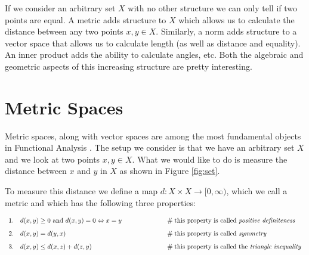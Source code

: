 \documentclass{article}
\theoremstyle{definition}
\begin{document}
\bigskip
\noindent
If we consider an arbitrary set $X$ with no other structure we
can only tell if two points are equal. A metric adds structure to
$X$ which allows us to calculate the distance between any two
points $x,y \in X$. Similarly, a norm adds structure to a vector
space that allows us to calculate length (as well as distance and
equality).  An inner product adds the ability to calculate
angles, etc. Both the algebraic and geometric aspects of this
increasing structure are pretty interesting.

\section{Metric Spaces}
\label{sec:metric_spaces}
Metric spaces, along with vector spaces are among the most
fundamental objects in Functional Analysis \cite{metric_spaces}.
The setup we consider is that we have an arbitrary set $X$ and we
look at two points $x,y \in X$. What we would like to do is
measure the distance between $x$ and $y$ in $X$ as shown in
Figure \ref{fig:set}.

\bigskip
\noindent
To measure this distance we define a map $d: X \times X
\rightarrow [0,\infty)$, which we call a metric and which has the
following three properties:


\begin{equation*}
\begin{array}{llll}
1. & d(x,y) \geq 0 \text{ and } d(x,y) = 0 \Leftrightarrow x = y
                && \hspace{5em} \mathrel{\#} \text{this property is called \emph{positive definiteness}} \\
[8pt]
2. & d(x,y) = d(y,x)
                && \hspace{5em} \mathrel{\#} \text{this property is called \emph{symmetry}} \\
[8pt]
3. & d(x,y) \leq d(x,z) + d(z,y)
                && \hspace{5em} \mathrel{\#} \text{this property is called the \emph{triangle inequality}} 
\vspace{0.50cm}																			%
\end{array}
\end{equation*}
\end{document}
